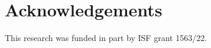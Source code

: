 \documentclass[letterpaper]{article} %
\begin{document}



%
\newpage
\section*{Acknowledgements}
This research was funded in part by ISF grant 1563/22.


\end{document}
